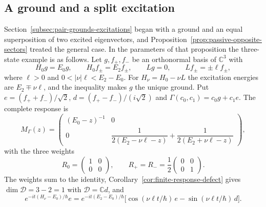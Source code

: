 \documentclass[11pt]{article}
\theoremstyle{definition}
\newcommand{\C}{\mathbb C}
\begin{document}
\subsection{A ground and a split excitation}
\label{subsec:four-maps-three-state}

Section~\ref{subsec:pair-grounds-excitations} began with a ground and an equal superposition of two excited eigenvectors, and Proposition~\ref{prop:passive-opposite-sectors} treated the general case. In the parameters of that proposition the three-state example is as follows. Let $g,f_+,f_-$ be an orthonormal basis of $\C^3$ with
\begin{equation}
 H_0g=E_0g,\qquad H_0f_\pm=E_2f_\pm,\qquad Lg=0,\qquad Lf_\pm=\pm\ell f_\pm ,
 \label{eq:four-maps-three-state-data}
\end{equation}
where $\ell>0$ and $0<|\nu|\ell<E_2-E_0$. For $H_\nu=H_0-\nu L$ the excitation energies are $E_2\mp\nu\ell$, and the inequality makes $g$ the unique ground. Put $e=(f_++f_-)/\sqrt2$, $d=(f_+-f_-)/(i\sqrt2)$ and $\Gamma(c_0,c_1)=c_0g+c_1e$. The complete response is
\begin{equation}
 M_\Gamma(z)=\begin{pmatrix}(E_0-z)^{-1}&0\\[2pt]
   0&\dfrac{1}{2(E_2-\nu\ell-z)}+\dfrac{1}{2(E_2+\nu\ell-z)}\end{pmatrix},
 \label{eq:four-maps-three-state-response}
\end{equation}
with the three weights
\begin{equation}
 R_0=\begin{pmatrix}1&0\\0&0\end{pmatrix},\qquad R_+=R_-=\frac12\begin{pmatrix}0&0\\0&1\end{pmatrix}.
 \label{eq:four-maps-three-state-weights}
\end{equation}
The weights sum to the identity, Corollary~\ref{cor:finite-response-defect} gives $\dim\mathcal D=3-2=1$ with $\mathcal D=\C d$, and
\begin{equation}
 e^{-it(H_\nu-E_0)/\hbar}e=e^{-it(E_2-E_0)/\hbar}\bigl[\cos(\nu\ell t/\hbar)\,e-\sin(\nu\ell t/\hbar)\,d\bigr].
 \label{eq:four-maps-three-state-transfer}
\end{equation}
\end{document}
